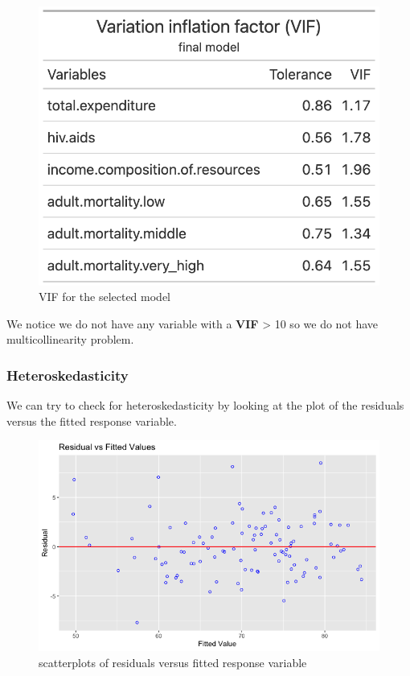 \begin{figure}[H]
	\centering
	\includegraphics{figures/models/vif_final_model.png}
	\caption{VIF for the selected model}
	\label{fig:vif_final_model}
\end{figure}

We notice we do not have any variable with a \textbf{VIF} > 10 so we do not have multicollinearity problem.

\subsubsection{Heteroskedasticity}

We can try to check for heteroskedasticity by looking at the plot of the residuals versus the fitted response variable.

\begin{figure}[H]
	\centering
	\includegraphics{figures/models/residuals_vs_fitted_response.png}
	\caption{scatterplots of residuals versus fitted response variable}
	\label{fig:residuals_vs_fitted_response}
\end{figure}


